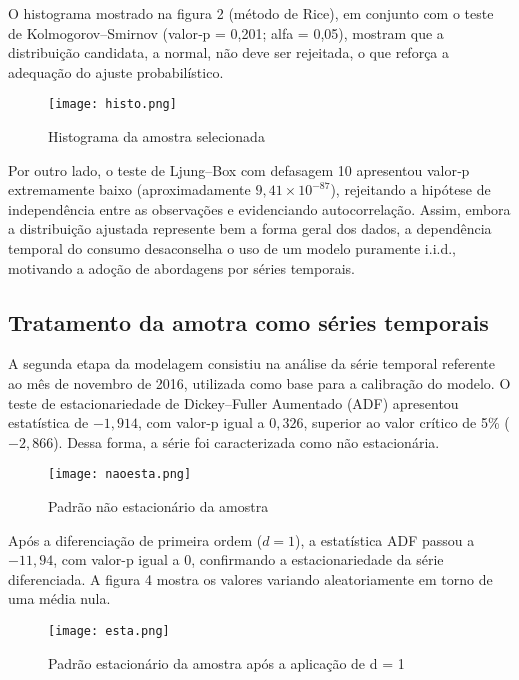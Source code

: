 \documentclass[journal]{IEEEtran}
\begin{document}
O histograma mostrado na figura 2 (método de Rice), em conjunto com o teste de Kolmogorov–Smirnov (valor‑p = 0,201; alfa = 0,05), mostram que a distribuição candidata, a normal, não deve ser rejeitada, o que reforça a adequação do ajuste probabilístico. 

\begin{figure}[!htb]
    \centering
    \texttt{[image: histo.png]}
    \caption{ Histograma da amostra selecionada}
    \label{fig:histo.png}
\end{figure}


Por outro lado, o teste de Ljung–Box com defasagem 10 apresentou valor‑p extremamente baixo (aproximadamente $9,41 \times 10^{-87}$), rejeitando a hipótese de independência entre as observações e evidenciando autocorrelação. Assim, embora a distribuição ajustada represente bem a forma geral dos dados, a dependência temporal do consumo desaconselha o uso de um modelo puramente i.i.d., motivando a adoção de abordagens por séries temporais.

\subsection {Tratamento da amotra como séries temporais}
A segunda etapa da modelagem consistiu na análise da série temporal referente ao mês de novembro de 2016, utilizada como base para a calibração do modelo. O teste de estacionariedade de Dickey–Fuller Aumentado (ADF) apresentou estatística de $-1{,}914$, com valor-p igual a $0{,}326$, superior ao valor crítico de 5\% ($-2{,}866$). Dessa forma, a série foi caracterizada como não estacionária. 

\begin{figure}[!htb]
    \centering
    \texttt{[image: naoesta.png]}
    \caption{ Padrão não estacionário da amostra}
    \label{fig:naoesta.png}
\end{figure}


Após a diferenciação de primeira ordem ($d=1$), a estatística ADF passou a $-11{,}94$, com valor-p igual a $0$, confirmando a estacionariedade da série diferenciada. A figura 4 mostra os valores variando aleatoriamente em torno de uma média nula.

\begin{figure}[!htb]
    \centering
    \texttt{[image: esta.png]}
    \caption{ Padrão estacionário da amostra após a aplicação de d = 1}
    \label{fig:esta.png}
\end{figure}
\end{document}
